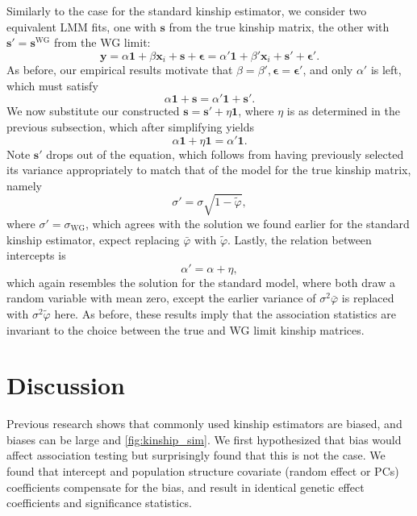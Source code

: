 \documentclass[11pt]{article}
\begin{document}
Similarly to the case for the standard kinship estimator, we consider two equivalent LMM fits, one with $\mathbf{s}$ from the true kinship matrix, the other with $\mathbf{s}' = \mathbf{s}^\text{WG}$ from the WG limit:
$$
\mathbf{y}
=
\alpha \mathbf{1} + \beta \mathbf{x}_i + \mathbf{s} + \boldsymbol{\epsilon}
=
\alpha' \mathbf{1} + \beta' \mathbf{x}_i + \mathbf{s}' + \boldsymbol{\epsilon}'
.
$$
As before, our empirical results motivate that $\beta = \beta', \boldsymbol{\epsilon} = \boldsymbol{\epsilon}'$, and only $\alpha'$ is left, which must satisfy
$$
\alpha \mathbf{1} + \mathbf{s}
=
\alpha' \mathbf{1} + \mathbf{s}'
.
$$
We now substitute our constructed $\mathbf{s} = \mathbf{s}' + \eta \mathbf{1}$, where $\eta$ is as determined in the previous subsection, which after simplifying yields
$$
\alpha \mathbf{1} + \eta \mathbf{1}
=
\alpha' \mathbf{1}
.
$$
Note $\mathbf{s}'$ drops out of the equation, which follows from having previously selected its variance appropriately to match that of the model for the true kinship matrix, namely
$$
\sigma' = \sigma \sqrt{ 1 - \tilde{\varphi} },
$$
where $\sigma' = \sigma_\text{WG}$, which agrees with the solution we found earlier for the standard kinship estimator, expect replacing $\bar{\varphi}$ with $\tilde{\varphi}$.
Lastly, the relation between intercepts is
$$
\alpha' = \alpha + \eta,
$$
which again resembles the solution for the standard model, where both draw a random variable with mean zero, except the earlier variance of $\sigma^2 \bar{\varphi}$ is replaced with $\sigma^2 \tilde{\varphi}$ here.
As before, these results imply that the association statistics are invariant to the choice between the true and WG limit kinship matrices.





\section{Discussion}

Previous research shows that commonly used kinship estimators are biased, and biases can be large \citep{ochoa_estimating_2021} and \cref{fig:kinship_sim}. We first hypothesized that bias would affect association testing but surprisingly found that this is not the case.
We found that intercept and population structure covariate (random effect or PCs) coefficients compensate for the bias, and result in identical genetic effect coefficients and significance statistics.
\end{document}
